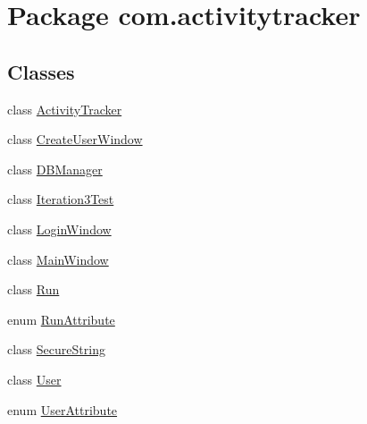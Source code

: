 \hypertarget{namespacecom_1_1activitytracker}{}\section{Package com.\+activitytracker}
\label{namespacecom_1_1activitytracker}
\subsection*{Classes}
\begin{DoxyCompactItemize}
\item 
class \hyperlink{classcom_1_1activitytracker_1_1_activity_tracker}{Activity\+Tracker}
\item 
class \hyperlink{classcom_1_1activitytracker_1_1_create_user_window}{Create\+User\+Window}
\item 
class \hyperlink{classcom_1_1activitytracker_1_1_d_b_manager}{D\+B\+Manager}
\item 
class \hyperlink{classcom_1_1activitytracker_1_1_iteration3_test}{Iteration3\+Test}
\item 
class \hyperlink{classcom_1_1activitytracker_1_1_login_window}{Login\+Window}
\item 
class \hyperlink{classcom_1_1activitytracker_1_1_main_window}{Main\+Window}
\item 
class \hyperlink{classcom_1_1activitytracker_1_1_run}{Run}
\item 
enum \hyperlink{enumcom_1_1activitytracker_1_1_run_attribute}{Run\+Attribute}
\item 
class \hyperlink{classcom_1_1activitytracker_1_1_secure_string}{Secure\+String}
\item 
class \hyperlink{classcom_1_1activitytracker_1_1_user}{User}
\item 
enum \hyperlink{enumcom_1_1activitytracker_1_1_user_attribute}{User\+Attribute}
\end{DoxyCompactItemize}
